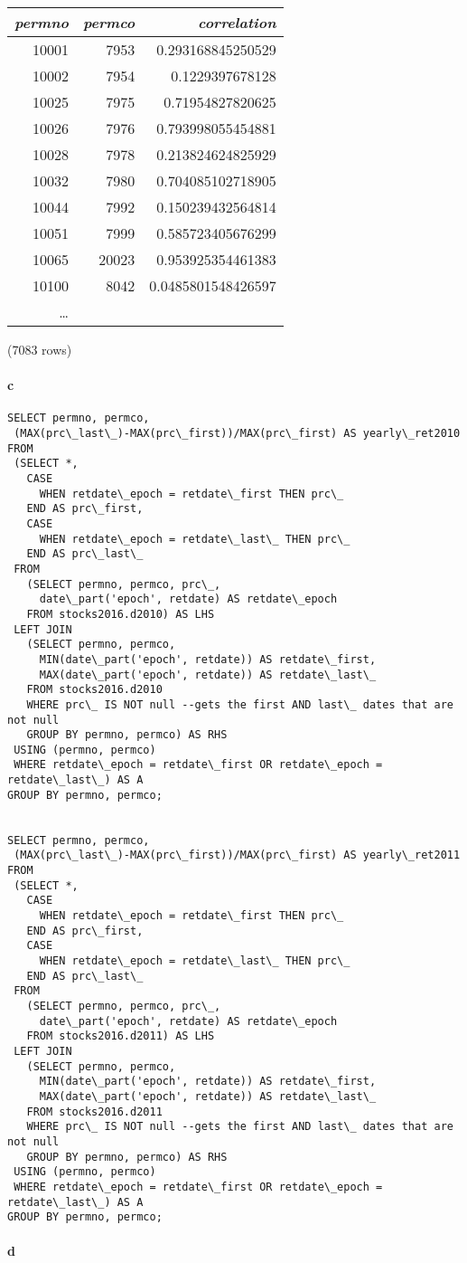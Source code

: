 \documentclass[]{article}
\let\oldparagraph\paragraph
\renewcommand{\paragraph}[1]{\oldparagraph{#1}\mbox{}}
\begin{document}
\begin{center}
\begin{tabular}{r | r | r}
\textit{permno} & \textit{permco} & \textit{correlation} \\
\hline
10001 & 7953 & 0.293168845250529 \\
10002 & 7954 & 0.1229397678128 \\
10025 & 7975 & 0.71954827820625 \\
10026 & 7976 & 0.793998055454881 \\
10028 & 7978 & 0.213824624825929 \\
10032 & 7980 & 0.704085102718905 \\
10044 & 7992 & 0.150239432564814 \\
10051 & 7999 & 0.585723405676299 \\
10065 & 20023 & 0.953925354461383 \\
10100 & 8042 & 0.0485801548426597 \\
\ldots\\
\end{tabular}

\noindent (7083 rows) \\
\end{center}

\paragraph{c}

\color{blue}
\begin{verbatim}
SELECT permno, permco,
 (MAX(prc\_last\_)-MAX(prc\_first))/MAX(prc\_first) AS yearly\_ret2010
FROM
 (SELECT *,
   CASE
     WHEN retdate\_epoch = retdate\_first THEN prc\_
   END AS prc\_first,
   CASE
     WHEN retdate\_epoch = retdate\_last\_ THEN prc\_
   END AS prc\_last\_
 FROM
   (SELECT permno, permco, prc\_,
     date\_part('epoch', retdate) AS retdate\_epoch
   FROM stocks2016.d2010) AS LHS
 LEFT JOIN
   (SELECT permno, permco,
     MIN(date\_part('epoch', retdate)) AS retdate\_first,
     MAX(date\_part('epoch', retdate)) AS retdate\_last\_
   FROM stocks2016.d2010
   WHERE prc\_ IS NOT null --gets the first AND last\_ dates that are not null
   GROUP BY permno, permco) AS RHS
 USING (permno, permco)
 WHERE retdate\_epoch = retdate\_first OR retdate\_epoch = retdate\_last\_) AS A
GROUP BY permno, permco;


SELECT permno, permco,
 (MAX(prc\_last\_)-MAX(prc\_first))/MAX(prc\_first) AS yearly\_ret2011
FROM
 (SELECT *,
   CASE
     WHEN retdate\_epoch = retdate\_first THEN prc\_
   END AS prc\_first,
   CASE
     WHEN retdate\_epoch = retdate\_last\_ THEN prc\_
   END AS prc\_last\_
 FROM
   (SELECT permno, permco, prc\_,
     date\_part('epoch', retdate) AS retdate\_epoch
   FROM stocks2016.d2011) AS LHS
 LEFT JOIN
   (SELECT permno, permco,
     MIN(date\_part('epoch', retdate)) AS retdate\_first,
     MAX(date\_part('epoch', retdate)) AS retdate\_last\_
   FROM stocks2016.d2011
   WHERE prc\_ IS NOT null --gets the first AND last\_ dates that are not null
   GROUP BY permno, permco) AS RHS
 USING (permno, permco)
 WHERE retdate\_epoch = retdate\_first OR retdate\_epoch = retdate\_last\_) AS A
GROUP BY permno, permco;
\end{verbatim}
\color{black}


\paragraph{d}
\end{document}
